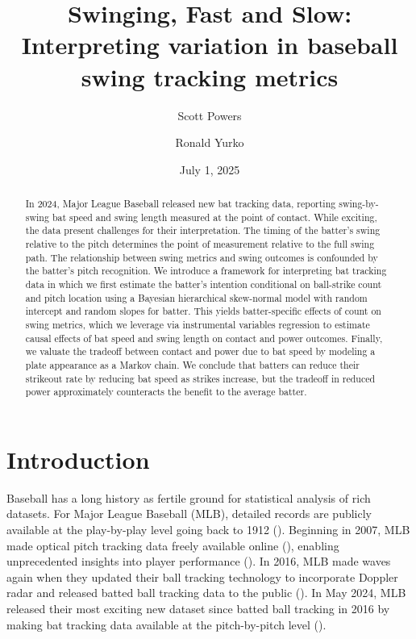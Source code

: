 \documentclass{article}
\title{Swinging, Fast and Slow:\\Interpreting variation in baseball swing tracking metrics}
\author[1*]{Scott Powers}
\author[2*]{Ronald Yurko}
\affil[1]{Department of Sport Management, Rice University}
\affil[2]{Department of Statistics \& Data Science, Carnegie Mellon University}
\date{July 1, 2025}
\begin{document}
  \maketitle

  \def\thefootnote{*}
	
  \begin{abstract}
    In 2024, Major League Baseball released new bat tracking data, reporting swing-by-swing bat speed and swing length measured at the point of contact. While exciting, the data present challenges for their interpretation. The timing of the batter's swing relative to the pitch determines the point of measurement relative to the full swing path. The relationship between swing metrics and swing outcomes is confounded by the batter's pitch recognition. We introduce a framework for interpreting bat tracking data in which we first estimate the batter's intention conditional on ball-strike count and pitch location using a Bayesian hierarchical skew-normal model with random intercept and random slopes for batter. This yields batter-specific effects of count on swing metrics, which we leverage via instrumental variables regression to estimate causal effects of bat speed and swing length on contact and power outcomes. Finally, we valuate the tradeoff between contact and power due to bat speed by modeling a plate appearance as a Markov chain. We conclude that batters can reduce their strikeout rate by reducing bat speed as strikes increase, but the tradeoff in reduced power approximately counteracts the benefit to the average batter.
  \end{abstract}

  \section{Introduction}
  \label{sec:introduction}

    Baseball has a long history as fertile ground for statistical analysis of rich datasets. For Major League Baseball (MLB), detailed records are publicly available at the play-by-play level going back to 1912 (\cite{retrosheet_retrosheet_2025}). Beginning in 2007, MLB made optical pitch tracking data freely available online
    (\cite{fast_what_2010}), enabling unprecedented insights into player performance (\cite{swartz_quality_2017}). In 2016, MLB made waves again when they updated their ball tracking technology to incorporate Doppler radar and released batted ball tracking data to the public (\cite{arthur_new_2016}). In May 2024, MLB released their most exciting new dataset since batted ball tracking in 2016 by making bat tracking data available at the pitch-by-pitch level (\cite{petriello_everything_2024}).
\end{document}
